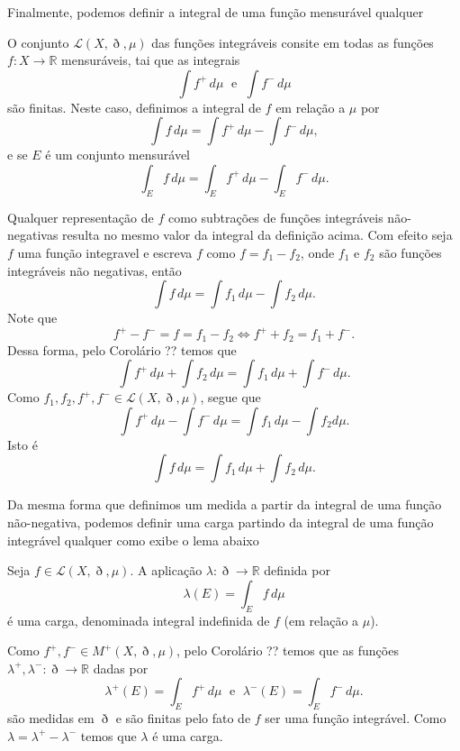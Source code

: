 \documentclass[a4paper, 11pt]{book}
\theoremstyle{definition}
\newcommand{\bR}{\mathbb{R}}
\newcommand{\cL}{\mathcal{L}}
\begin{document}
Finalmente, podemos definir a integral de uma função mensurável qualquer

\begin{dbox}
    O conjunto $\cL(X,\eth,\mu)$ das funções integráveis consite em todas as funções $f : X \to \bR$ mensuráveis, tai que as integrais
    \[
        \int f^+ \,d\mu \;\text{ e }\; \int f^- \,d\mu
    \]
    são finitas.
    Neste caso, definimos a integral de $f$ em relação a $\mu$ por
    \[
        \int f \, d\mu = \int f^+ \, d\mu - \int f^- \, d\mu,
    \]
    e se $E$ é um conjunto mensurável
    \[
        \int_E f \, d\mu = \int_E f^+ \, d\mu - \int_E f^- \, d\mu.
    \]
\end{dbox}

Qualquer representação de $f$ como subtrações de funções integráveis não-negativas resulta no mesmo valor da integral da definição acima.
Com efeito seja $f$ uma função integravel e escreva $f$ como $f = f_1 - f_2$, onde $f_1$ e $f_2$ são funções integráveis não negativas, então
\[
    \int f \,d\mu = \int f_1 \, d\mu - \int f_2 \,d \mu.
\]
Note que
\[
    f^+ - f^- = f = f_1 - f_2 \iff f^+ + f_2 = f_1 + f^-.
\]
Dessa forma, pelo Corolário ?? temos que
\[
    \int f^+ \,d\mu + \int f_2 \, d\mu = \int f_1\,d\mu + \int f^- \, d\mu.
\]
Como $f_1, f_2, f^+,f^- \in \cL(X,\eth,\mu)$, segue que
\[
    \int f^+ \,d\mu - \int f^- \, d\mu = \int f_1 \,d\mu - \int f_2 d\mu.
\]
Isto é
\[
    \int f \, d\mu = \int f_1 \,d\mu + \int f_2 \,d\mu.
\]

Da mesma forma que definimos um medida a partir da integral de uma função não-negativa, podemos definir uma carga partindo da integral de uma função integrável qualquer como exibe o lema abaixo

\begin{lbox} \label{lm:carga-integral}
    Seja $f \in \cL(X,\eth,\mu)$. A aplicação $\lambda : \eth \to \bR$ definida por
    \[
        \lambda(E) = \int_E f \, d\mu
    \]
    é uma carga, denominada integral indefinida de $f$ (em relação a $\mu$).
\end{lbox}
\begin{prf}
    Como $f^+, f^- \in M^+(X,\eth,\mu)$, pelo Corolário ?? temos que as funções $\lambda^+, \lambda^- : \eth \to \bR$ dadas por
    \[
        \lambda^+(E) = \int_E f^+ \,d\mu \;\text{ e }\; \lambda^-(E) = \int_E f^- \,d\mu.
    \]
    são medidas em $\eth$ e são finitas pelo fato de $f$ ser uma função integrável. Como $\lambda = \lambda^+ - \lambda^-$ temos que $\lambda$ é uma carga.
\end{prf}
\end{document}
